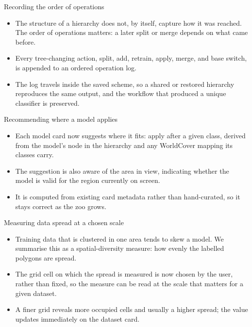 \documentclass[aspectratio=169]{beamer}
\begin{document}
\begin{frame}{Recording the order of operations}
\begin{itemize}
  \item The structure of a hierarchy does not, by itself, capture how it was reached. The order
  of operations matters: a later split or merge depends on what came before.
  \item Every tree-changing action, split, add, retrain, apply, merge, and base switch, is
  appended to an ordered operation log.
  \item The log travels inside the saved scheme, so a shared or restored hierarchy reproduces
  the same output, and the workflow that produced a unique classifier is preserved.
\end{itemize}
\end{frame}

\begin{frame}{Recommending where a model applies}
\begin{itemize}
  \item Each model card now suggests where it fits: apply after a given class, derived from the
  model's node in the hierarchy and any WorldCover mapping its classes carry.
  \item The suggestion is also aware of the area in view, indicating whether the model is valid
  for the region currently on screen.
  \item It is computed from existing card metadata rather than hand-curated, so it stays correct
  as the zoo grows.
\end{itemize}
\end{frame}

\begin{frame}{Measuring data spread at a chosen scale}
\begin{itemize}
  \item Training data that is clustered in one area tends to skew a model. We summarise this as
  a spatial-diversity measure: how evenly the labelled polygons are spread.
  \item The grid cell on which the spread is measured is now chosen by the user, rather than
  fixed, so the measure can be read at the scale that matters for a given dataset.
  \item A finer grid reveals more occupied cells and usually a higher spread; the value updates
  immediately on the dataset card.
\end{itemize}
\end{frame}
\end{document}
